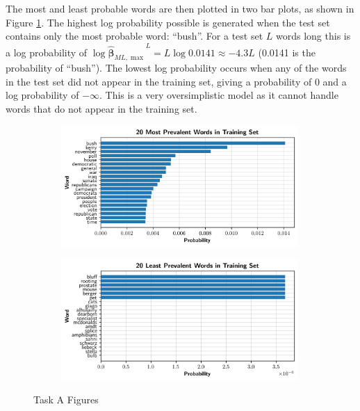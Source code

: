 \documentclass[11pt]{amsart}
\begin{document}
The most and least probable words are then plotted in two bar plots, as shown in Figure \ref{fig:taska_all}. The highest log probability possible is generated when the test set contains only the most probable word: ``bush''. For a test set $L$ words long this is a log probability of $\log{{}\hat{\bm{\beta}}_{ML,\max}}^{L} = L\log0.0141 \approx -4.3L$ (0.0141 is the probability of ``bush''). The lowest log probability occurs when any of the words in the test set did not appear in the training set, giving a probability of 0 and a log probability of $-\infty$. This is a very oversimplistic model as it cannot handle words that do not appear in the training set.
\begin{figure}[h]
    \centering
    \begin{subfigure}[b]{0.49\textwidth}
        \centering
        \includegraphics[width=0.99\textwidth]{../plots/a_histogram.png}
    \end{subfigure}
    \hfill
    \begin{subfigure}[b]{0.49\textwidth}
        \centering
        \includegraphics[width=0.99\textwidth]{../plots/a_histogram_bottom.png}
    \end{subfigure}
    \caption{Task A Figures}\label{fig:taska_all}
\end{figure}
\end{document}
